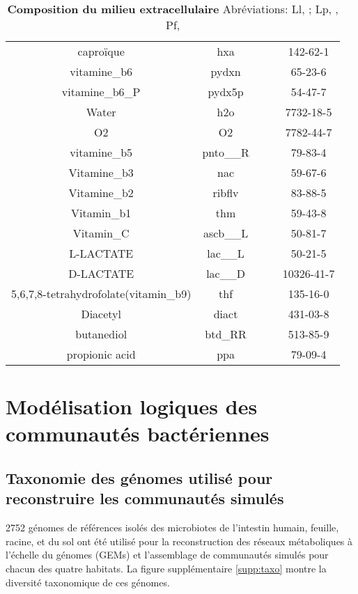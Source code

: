 \documentclass[../main.tex]{subfiles}
\begin{document}
\begin{table}[H]
\begin{adjustbox}{width=0.8\textwidth}
\begin{tabular}{|c|c|c|c|c|}
caproïque &	hxa &	\checkmark & &	142-62-1	\\
vitamine\_b6 &	pydxn &	\checkmark & &	65-23-6	\\
vitamine\_b6\_P &	pydx5p &	\checkmark & &	54-47-7	\\
Water &	h2o &	\checkmark & &	7732-18-5	\\
O2 &	O2 &	\checkmark & &	7782-44-7	\\
vitamine\_b5 &	pnto\_\_R &	\checkmark & & 79-83-4	\\
Vitamine\_b3 &	nac &	\checkmark & &	59-67-6	\\
Vitamine\_b2 &	ribflv &	\checkmark & &	83-88-5	\\
Vitamin\_b1 &	thm &	\checkmark & &	59-43-8	\\
Vitamin\_C &	ascb\_\_L &\checkmark & &	50-81-7	\\
L-LACTATE &	lac\_\_L &	&	\checkmark &	50-21-5	\\
D-LACTATE &	lac\_\_D &	 &	\checkmark &	10326-41-7	\\
5,6,7,8-tetrahydrofolate(vitamin\_b9) &	thf &	\checkmark & &	135-16-0	\\
Diacetyl &	diact &	 &	\checkmark &	431-03-8	\\
butanediol &	btd\_RR &	 &	\checkmark &	513-85-9	\\
propionic acid &	ppa &	 &	\checkmark &	79-09-4 \\
 \hline
\end{tabular}
\end{adjustbox}
\caption{\textbf{Composition du milieu extracellulaire} Abréviations: Ll, \lactis; Lp, \plantarum, Pf, \freud}
\label{table:graines}
\end{table}

\chapter*{Modélisation logiques des communautés bactériennes}

\section*{Taxonomie des génomes utilisé pour reconstruire les communautés simulés}
2752 génomes de références isolés des microbiotes de l'intestin humain, feuille, racine, et du sol ont été utilisé pour la reconstruction des réseaux métaboliques à l'échelle du génomes (GEMs) et l'assemblage de communautés simulés pour chacun des quatre habitats. La figure supplémentaire \ref{supp:taxo} montre la diversité taxonomique de ces génomes.
\end{document}

